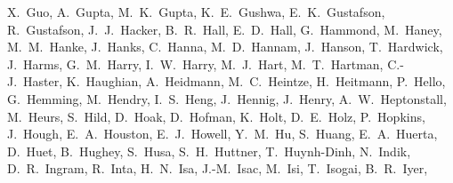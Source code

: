 {X.~Guo,  %
A.~Gupta,  %
M.~K.~Gupta,  %
K.~E.~Gushwa,  %
E.~K.~Gustafson,  %
R.~Gustafson,  %
J.~J.~Hacker,  %
B.~R.~Hall,  %
E.~D.~Hall,  %
G.~Hammond,  %
M.~Haney,  %
M.~M.~Hanke,  %
J.~Hanks,  %
C.~Hanna,  %
M.~D.~Hannam,  %
J.~Hanson,  %
T.~Hardwick,  %
J.~Harms, %
G.~M.~Harry,  %
I.~W.~Harry,  %
M.~J.~Hart,  %
M.~T.~Hartman,  %
C.-J.~Haster,  %
K.~Haughian,  %
A.~Heidmann, %
M.~C.~Heintze,  %
H.~Heitmann, %
P.~Hello, %
G.~Hemming, %
M.~Hendry,  %
I.~S.~Heng,  %
J.~Hennig,  %
J.~Henry,  %
A.~W.~Heptonstall,  %
M.~Heurs,  %
S.~Hild,  %
D.~Hoak,  %
D.~Hofman, %
K.~Holt,  %
D.~E.~Holz,  %
P.~Hopkins,  %
J.~Hough,  %
E.~A.~Houston,  %
E.~J.~Howell,  %
Y.~M.~Hu,  %
S.~Huang,  %
E.~A.~Huerta,  %
D.~Huet, %
B.~Hughey,  %
S.~Husa,  %
S.~H.~Huttner,  %
T.~Huynh-Dinh,  %
N.~Indik,  %
D.~R.~Ingram,  %
R.~Inta,  %
H.~N.~Isa,  %
J.-M.~Isac, %
M.~Isi,  %
T.~Isogai,  %
B.~R.~Iyer,  %
}
